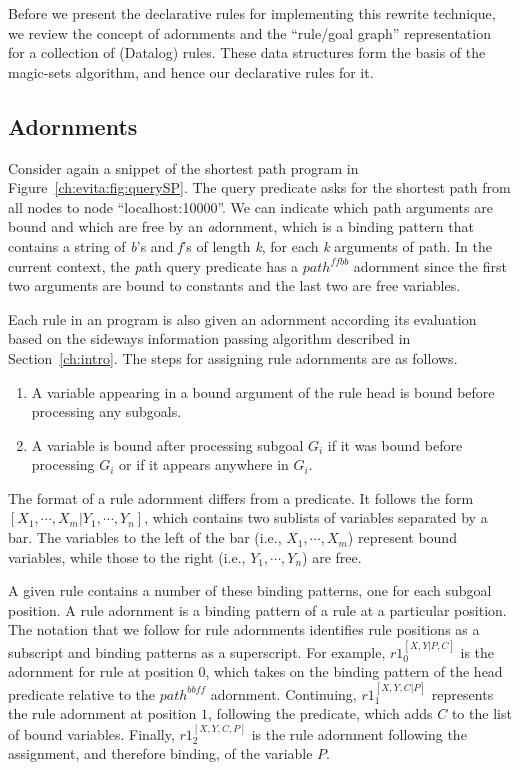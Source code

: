 Before we present the declarative rules for implementing this rewrite
technique, we review the concept of adornments and the ``rule/goal graph''
representation for a collection of \OVERLOG (Datalog) rules.  These data
structures form the basis of the magic-sets algorithm, and hence our
declarative rules for it.

\subsection{Adornments}

Consider again a snippet of the shortest path program in Figure~\ref{ch:evita:fig:querySP}.  
The query predicate  asks for the shortest path from all nodes to node
``localhost:10000''.  We can indicate which path arguments are bound and which
are free by an {\emph adornment}, which is a binding pattern that contains a
string of {\emph b's} and {\emph f's} of length {\emph k}, for each {\emph k}
arguments of path.  In the current context, the {\emph path} query predicate has
a $path^{ffbb}$ adornment since the first two arguments are bound to constants
and the last two are free variables.

Each rule in an \OVERLOG program is also given an adornment according its
evaluation based on the sideways information passing algorithm described in
Section~\ref{ch:intro}.  The steps for assigning rule adornments are as
follows.
\begin{enumerate}
\item A variable appearing in a bound argument of the rule head is bound before processing any subgoals.
\item A variable is bound after processing subgoal $G_i$ if it was bound
  before processing $G_i$ or if it appears anywhere in $G_i$.
\end{enumerate}
The format of a rule adornment differs from a predicate.  It follows the form
$[X_1,\cdots,X_m|Y_1,\cdots,Y_n]$, which contains two sublists of variables
separated by a bar.  The variables to the left of the bar (i.e.,
$X_1,\cdots,X_m$) represent bound variables, while those to the right (i.e.,
$Y_1,\cdots,Y_n$) are free. 

A given rule contains a number of these binding patterns, one for each subgoal
position.  A rule adornment is a binding pattern of a rule at a particular
position.  The notation that we follow for rule adornments identifies rule
positions as a subscript and binding patterns as a superscript.  For example,
$r1_0^{[X,Y|P,C]}$ is the adornment for rule  at position $0$, which
takes on the binding pattern of the head predicate relative to the
$path^{bbff}$ adornment. Continuing, $r1_1^{[X,Y,C|P]}$ represents the rule
adornment at position $1$, following the  predicate, which adds
$C$ to the list of bound variables. Finally, $r1_2^{[X,Y,C,P]}$ is the
rule adornment following the assignment, and therefore binding, of the variable
$P$.

